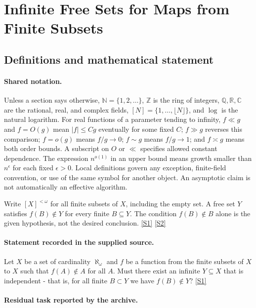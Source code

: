 \documentclass[11pt,a4paper]{article}
\newcommand{\N}{\mathbb{N}}
\newcommand{\Z}{\mathbb{Z}}
\newcommand{\Q}{\mathbb{Q}}
\newcommand{\R}{\mathbb{R}}
\newcommand{\C}{\mathbb{C}}
\newcommand{\sref}[2]{\hyperlink{source:#1:#2}{[S#2]}}
\begin{document}
\section{Infinite Free Sets for Maps from Finite Subsets}\label{statement}


\subsection{Definitions and mathematical statement}

\paragraph{Shared notation.}Unless a section says otherwise, $\N=\{1,2,\ldots\}$,
$\Z$ is the ring of integers, $\Q,\R,\C$ are the rational, real, and complex
fields, $[N]=\{1,\ldots,\lfloor N\rfloor\}$, and $\log$ is the natural
logarithm. For real functions of a parameter tending to infinity,
$f\ll g$ and $f=O(g)$ mean $|f|\leq Cg$ eventually for some fixed $C$;
$f\gg g$ reverses this comparison; $f=o(g)$ means $f/g\to0$;
$f\sim g$ means $f/g\to1$; and $f\asymp g$ means both order bounds.
A subscript on $O$ or $\ll$ specifies allowed constant dependence.
The expression $n^{o(1)}$ in an upper bound means growth smaller than
$n^\epsilon$ for each fixed $\epsilon>0$. Local definitions govern any
exception, finite-field convention, or use of the same symbol for another
object. An asymptotic claim is not automatically an effective algorithm.



Write $[X]^{<\omega}$ for all finite subsets of $X$, including the empty set. A free set $Y$ satisfies $f(B)\notin Y$ for every finite $B\subseteq Y$. The condition $f(B)\notin B$ alone is the given hypothesis, not the desired conclusion. \sref{statement}{1} \sref{statement}{2}

\paragraph{Statement recorded in the supplied source.}
Let $X$ be a set of cardinality $\aleph_\omega$ and $f$ be a function from the finite subsets of $X$ to $X$ such that $f(A)\not\in A$ for all $A$. Must there exist an infinite $Y\subseteq X$ that is independent - that is, for all finite $B\subset Y$ we have $f(B)\not\in Y$? \sref{statement}{1}

\paragraph{Residual task reported by the archive.}
\end{document}
